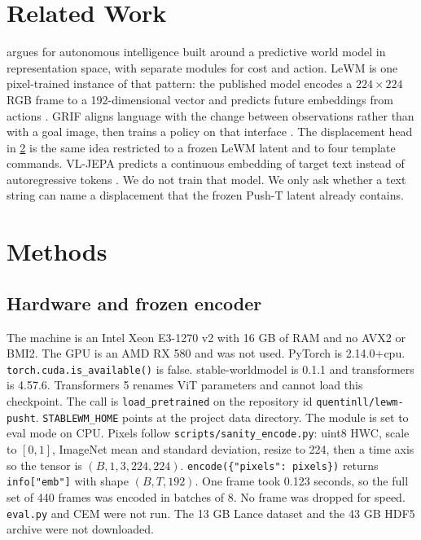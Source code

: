 \documentclass[11pt,a4paper]{article}
\begin{document}
\section{Related Work}
\label{sec:related}
\citet{lecun2022path} argues for autonomous intelligence built around a predictive world model in representation space, with separate modules for cost and action.
LeWM is one pixel-trained instance of that pattern: the published model encodes a $224\times 224$ RGB frame to a 192-dimensional vector and predicts future embeddings from actions \citep{maes2026lewm}.
GRIF aligns language with the change between observations rather than with a goal image, then trains a policy on that interface \citep{myers2023grif}.
The displacement head in \cref{sec:methods} is the same idea restricted to a frozen LeWM latent and to four template commands.
VL-JEPA predicts a continuous embedding of target text instead of autoregressive tokens \citep{chen2025vljepa}.
We do not train that model.
We only ask whether a text string can name a displacement that the frozen Push-T latent already contains.

\section{Methods}
\label{sec:methods}

\subsection{Hardware and frozen encoder}
The machine is an Intel Xeon E3-1270 v2 with 16 GB of RAM and no AVX2 or BMI2.
The GPU is an AMD RX 580 and was not used.
PyTorch is 2.14.0+cpu.
\texttt{torch.cuda.is\_available()} is false.
stable-worldmodel is 0.1.1 and transformers is 4.57.6.
Transformers 5 renames ViT parameters and cannot load this checkpoint.
The call is \texttt{load\_pretrained} on the repository id \texttt{quentinll/lewm-pusht}.
\texttt{STABLEWM\_HOME} points at the project data directory.
The module is set to eval mode on CPU.
Pixels follow \texttt{scripts/sanity\_encode.py}: uint8 HWC, scale to $[0,1]$, ImageNet mean and standard deviation, resize to 224, then a time axis so the tensor is $(B,1,3,224,224)$.
\texttt{encode(\{"pixels": pixels\})} returns \texttt{info["emb"]} with shape $(B,T,192)$.
One frame took 0.123 seconds, so the full set of 440 frames was encoded in batches of 8.
No frame was dropped for speed.
\texttt{eval.py} and CEM were not run.
The 13 GB Lance dataset and the 43 GB HDF5 archive were not downloaded.
\end{document}
